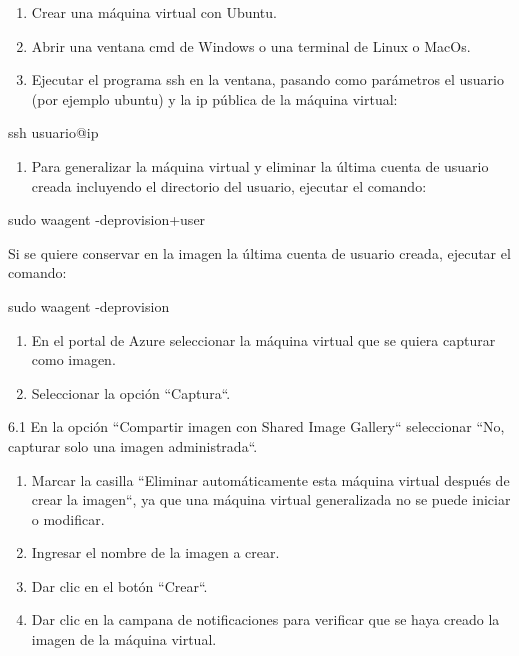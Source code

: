 \documentclass[11pt,a4paper,oneside]{book}
\begin{document}
\begin{enumerate}

\item Crear una máquina virtual con Ubuntu.

\item Abrir una ventana cmd de Windows o una terminal de Linux o MacOs.

\item Ejecutar el programa ssh en la ventana, pasando como parámetros el usuario (por ejemplo ubuntu) y la ip pública de la máquina virtual:

\end{enumerate}

\begin{SourceCode}
ssh usuario@ip
\end{SourceCode}

\begin{enumerate}

\item Para generalizar la máquina virtual y eliminar la última cuenta de usuario creada incluyendo el directorio del usuario, ejecutar el comando:

\end{enumerate}

\begin{SourceCode}
sudo waagent -deprovision+user
\end{SourceCode}

Si se quiere conservar en la imagen la última cuenta de usuario creada, ejecutar el comando:

\begin{SourceCode}
sudo waagent -deprovision
\end{SourceCode}

\begin{enumerate}

\item En el portal de Azure seleccionar la máquina virtual que se quiera capturar como imagen.

\item Seleccionar la opción ``Captura``.

\end{enumerate}

6.1 En la opción ``Compartir imagen con Shared Image Gallery`` seleccionar ``No, capturar solo una imagen administrada``.

\begin{enumerate}

\item Marcar la casilla ``Eliminar automáticamente esta máquina virtual después de crear la imagen``, ya que una máquina virtual generalizada no se puede iniciar o modificar.

\item Ingresar el nombre de la imagen a crear.

\item Dar clic en el botón ``Crear``.

\item Dar clic en la campana de notificaciones para verificar que se haya creado la imagen de la máquina virtual.

\end{enumerate}
\end{document}
